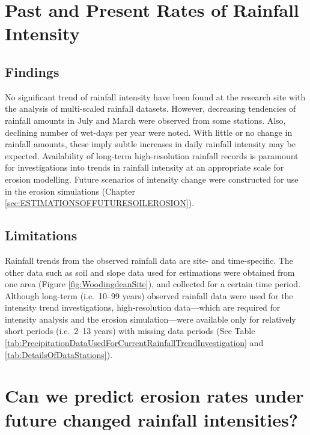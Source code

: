 \section{Past and Present Rates of Rainfall Intensity}
\label{sec:PastAndPresentRatesOfRainfallIntensity}
\subsection{Findings}
\label{sec:FindingsStage3}
No significant trend of rainfall intensity have been found at the research site
with the analysis of multi-scaled rainfall datasets. However, decreasing
tendencies of rainfall amounts in July and March were observed from some
stations. Also, declining number of wet-days per year were noted. With little or
no change in rainfall amounts, these imply subtle increases in daily rainfall
intensity may be expected.
Availability of long-term high-resolution rainfall records is paramount for
investigations into trends in rainfall intensity at an appropriate scale for
erosion modelling. Future scenarios of intensity change were constructed for use
in the erosion simulations (Chapter \ref{sec:ESTIMATIONSOFFUTURESOILEROSION}).

\subsection{Limitations}
\label{sec:LimitationsStage3}
Rainfall trends from the observed rainfall data are site- and time-specific. The
other data such as soil and slope data used for estimations were obtained from
one area (Figure \ref{fig:WoodingdeanSite}), and collected for a certain time
period. Although long-term (i.e.\ 10--99 years) observed rainfall data were used
for the intensity trend investigations, high-resolution data---which are
required for intensity analysis and the erosion simulation---were available only
for relatively short periods (i.e.\ 2--13 years) with missing data periods (See
Table \ref{tab:PrecipitationDataUsedForCurrentRainfallTrendInvestigation} and
\ref{tab:DetailsOfDataStations}).

\section{Can we predict erosion rates under future changed rainfall
intensities?}
\label{sec:CanWePredictErosionRatesUnderFutureChangedRainfallIntensities}
